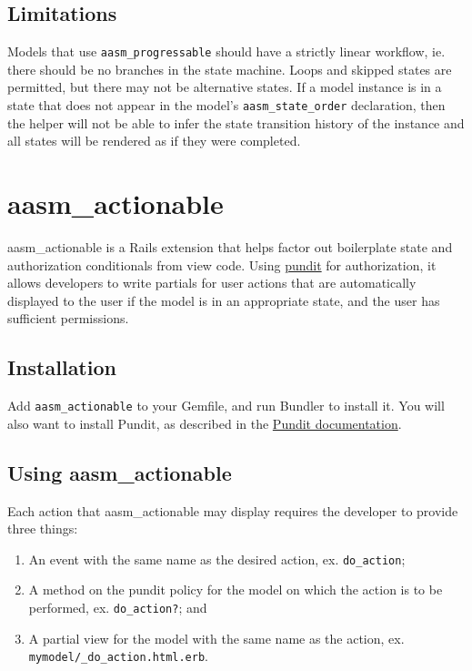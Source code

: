 \documentclass[document.tex]{subfiles}
\begin{document}
\subsection{Limitations}

Models that use {\tt aasm\_progressable} should have a strictly linear workflow, ie. there should be no branches in the state machine. Loops and skipped states are permitted, but there may not be alternative states. If a model instance is in a state that does not appear in the model's {\tt aasm\_state\_order} declaration, then the helper will not be able to infer the state transition history of the instance and all states will be rendered as if they were completed.


\section{aasm\_actionable}
\label {sec:aasm-actionable-manual}

aasm\_actionable is a Rails extension that helps factor out boilerplate state and authorization conditionals from view code. Using \href{https://github.com/elabs/pundit}{pundit} for authorization, it allows developers to write partials for user actions that are automatically displayed to the user if the model is in an appropriate state, and the user has sufficient permissions.

\subsection{Installation}

Add {\tt aasm\_actionable} to your Gemfile, and run Bundler to install it. You will also want to install Pundit, as described in the \href{https://github.com/elabs/pundit\#installation}{Pundit documentation}.

\subsection{Using aasm\_actionable}

Each action that aasm\_actionable may display requires the developer to provide three things:

\begin{enumerate}
\item An event with the same name as the desired action, ex. {\tt do\_action};
\item A method on the pundit policy for the model on which the action is to be performed, ex. {\tt do\_action?}; and
\item A partial view for the model with the same name as the action, ex. \\ {\tt mymodel/\_do\_action.html.erb}.
\end{enumerate}
\end{document}
